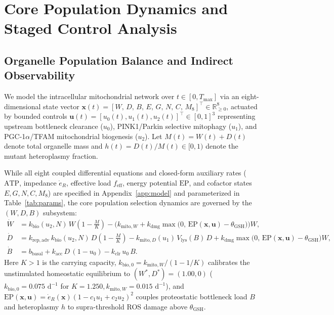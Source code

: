 \documentclass[11pt]{article}
\theoremstyle{plain}
\theoremstyle{remark}
\begin{document}
\section{Core Population Dynamics and Staged Control Analysis}

\subsection{Organelle Population Balance and Indirect Observability}
We model the intracellular mitochondrial network over $t \in [0, T_{\max}]$ via an eight-dimensional state vector $\mathbf{x}(t) = [W,\, D,\, B,\, E,\, G,\, N,\, C,\, M_8]^\top \in \mathbb{R}_{\ge 0}^8$, actuated by bounded controls $\mathbf{u}(t) = [u_0(t), u_1(t), u_2(t)]^\top \in [0, 1]^3$ representing upstream bottleneck clearance ($u_0$), PINK1/Parkin selective mitophagy ($u_1$), and PGC-1$\alpha$/TFAM mitochondrial biogenesis ($u_2$). Let $M(t) = W(t) + D(t)$ denote total organelle mass and $h(t) = D(t)/M(t) \in [0, 1)$ denote the mutant heteroplasmy fraction.

While all eight coupled differential equations and closed-form auxiliary rates ($\mathrm{ATP}$, impedance $\dot{e}_R$, effective load $f_{\mathrm{eff}}$, energy potential $\mathrm{EP}$, and cofactor states $E, G, N, C, M_8$) are specified in Appendix~\ref{app:model} and parameterized in Table~\ref{tab:params}, the core population selection dynamics are governed by the $(W, D, B)$ subsystem:
\begin{align}
  \dot{W} &= k_{\mathrm{bio}}(u_2, N)\,W\!\left(1 - \frac{M}{K}\right) - \Big(k_{\mathrm{mito},W} + k_{\mathrm{dmg}}\max\!\big(0,\, \mathrm{EP}(\mathbf{x}, \mathbf{u}) - \theta_{\mathrm{GSH}}\big)\Big)W, \label{eq:ode_W} \\
  \dot{D} &= k_{\mathrm{rep,adv}}\,k_{\mathrm{bio}}(u_2, N)\,D\!\left(1 - \frac{M}{K}\right) - k_{\mathrm{mito},D}(u_1)\,V_{\mathrm{lys}}(B)\,D + k_{\mathrm{dmg}}\max\!\big(0,\, \mathrm{EP}(\mathbf{x}, \mathbf{u}) - \theta_{\mathrm{GSH}}\big)W, \label{eq:ode_D} \\
  \dot{B} &= b_{\mathrm{basal}} + k_{\mathrm{acc}}\,D\,(1 - u_0) - k_{\mathrm{clr}}\,u_0\,B. \label{eq:ode_B}
\end{align}
Here $K > 1$ is the carrying capacity, $k_{\mathrm{bio},0} = k_{\mathrm{mito},W}/(1 - 1/K)$ calibrates the unstimulated homeostatic equilibrium to $(W^*, D^*) = (1.00, 0)$ ($k_{\mathrm{bio},0} = 0.075\text{ d}^{-1}$ for $K = 1.250, k_{\mathrm{mito},W} = 0.015\text{ d}^{-1}$), and $\mathrm{EP}(\mathbf{x}, \mathbf{u}) = \dot{e}_R(\mathbf{x})(1 - c_1 u_1 + c_2 u_2)^2$ couples proteostatic bottleneck load $B$ and heteroplasmy $h$ to supra-threshold ROS damage above $\theta_{\mathrm{GSH}}$.
\end{document}
